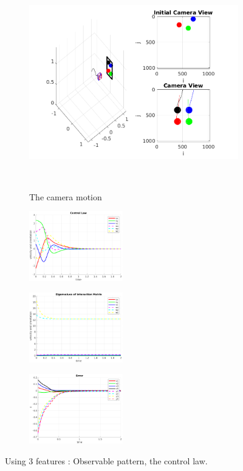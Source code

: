 \documentclass[a4paper,12pt]{article}
\begin{document}
\begin{figure}[t!]
		 \begin{subfigure}[b]{\textwidth}         
         	\centering
	         \includegraphics[width=13cm]{../results/Demo2-simulation.png}
    	     \caption{The camera motion}
    	     \vspace~
		 \end{subfigure}
         \begin{subfigure}[b]{0.32\textwidth}
        	\centering
	        \includegraphics[height=1.2in]{../results/Demo2-control-law.png}
		 \end{subfigure}
         \begin{subfigure}[b]{0.2\textwidth}
        	\centering
	        \includegraphics[height=1.2in]{../results/Demo2-eignen.png}
		 \end{subfigure}%
         \begin{subfigure}[b]{0.32\textwidth}
        	\centering
	        \includegraphics[height=1.2in]{../results/Demo2-error.png}
		 \end{subfigure}%
         \caption{Using 3 features : Observable pattern, the control law.}
 	\label{fig:demo2}
\end{figure}
\end{document}
